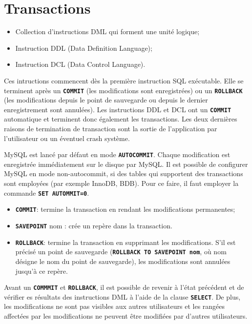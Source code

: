 \documentclass[a4paper, 12pt]{report}
\newcommand{\textSQL}[1]{\texttt{\textbf{#1}}}
\theoremstyle{definition} \newtheorem{ex}{Exemple}
\begin{document}
\section{Transactions}
\begin{itemize}
\item Collection d'instructions DML qui forment une unité logique;
\item Instruction DDL (Data Definition Language);
\item Instruction DCL (Data Control Language).
\end{itemize}
Ces intructions commencent dès la première instruction SQL exécutable. Elle se terminent après un \textSQL{COMMIT} (les modifications sont enregistrées) ou un \textSQL{ROLLBACK} (les modifications depuis le point de sauvegarde ou depuis le dernier enregistrement sont annulées). Les instructions DDL et DCL ont un \textSQL{COMMIT} automatique et terminent donc également les transactions. Les deux dernières raisons de termination de transaction sont la sortie de l'application par l'utilisateur ou un éventuel crash système.

MySQL est lancé par défaut en mode \textSQL{AUTOCOMMIT}. Chaque modification est enregistrée immédiatement sur le disque par MySQL. Il est possible de configurer MySQL en mode non-autocommit, si des tables qui supportent des transactions sont employées (par exemple InnoDB, BDB). Pour ce faire, il faut employer la commande \textSQL{SET AUTOMMIT=0}.

\begin{itemize}
\item \textSQL{COMMIT}: termine la transaction en rendant les modifications permanentes;
\item \textSQL{SAVEPOINT} nom : crée un repère dans la transaction.
\item \textSQL{ROLLBACK}: termine la transaction en supprimant les modifications. S'il est précisé un point de sauvegarde (\textSQL{ROLLBACK TO SAVEPOINT nom}, où nom désigne le nom du point de sauvegarde), les modifications sont annulées jusqu'à ce repère.
\end{itemize}

Avant un \textSQL{COMMMIT} et \textSQL{ROLLBACK}, il est possible de revenir à l'état précédent et de vérifier es résultats des instructions DML à l'aide de la clause \textSQL{SELECT}. De plus, les modifications ne sont pas visibles aux autres utilisateurs et les rangées affectées par les modifications ne peuvent être modifiées par d'autres utilisateurs.
\end{document}
